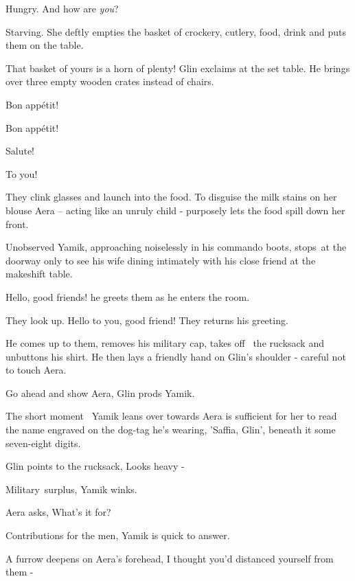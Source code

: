 \documentclass[12pt]{book}
\begin{document}
{\textquotedbl}Hungry. And how are \textit{you}?{\textquotedbl}

{\textquotedbl}Starving.{\textquotedbl} She deftly empties the basket of crockery, cutlery, food, drink and puts them on
the table.

{\textquotedbl}That basket of yours is a horn of plenty!{\textquotedbl} Glin exclaims at the set table. He brings over
three empty wooden crates instead of chairs.

{\textquotedbl}Bon app\'etit!{\textquotedbl}

{\textquotedbl}Bon app\'etit!{\textquotedbl}

{\textquotedbl}Salute!{\textquotedbl}

{\textquotedbl}To you!{\textquotedbl}

They clink glasses and launch into the food. To disguise the milk stains on her blouse Aera -- acting like an unruly
child - purposely lets the food spill down her front.

Unobserved Yamik, approaching noiselessly in his commando boots, stops~at the doorway only to see his wife dining
intimately with his close friend at the makeshift table.

{\textquotedbl}Hello, good friends!{\textquotedbl} he greets them as he enters the room. ~

They look up. {\textquotedbl}Hello to you,{ }good{ }friend!{\textquotedbl} They returns
his greeting.

He comes up to them, removes{ }his military cap, takes off \ the rucksack and
unbuttons his shirt. He then lays a friendly hand on Glin's shoulder - careful not to touch Aera.

{\textquotedbl}Go ahead and show Aera,{\textquotedbl} Glin prods Yamik.

The short moment \ Yamik leans over towards Aera is sufficient for her to read the name engraved on the
dog{{}-}tag he's wearing, 'Saffia, Glin', beneath it some seven-eight digits.

Glin points to the rucksack, {\textquotedbl}Looks heavy -{\textquotedbl}~

{\textquotedbl}Military~surplus,{\textquotedbl} Yamik winks.

Aera asks, {\textquotedbl}What's it for?{\textquotedbl}

{\textquotedbl}Contributions for the men,{\textquotedbl} Yamik is quick to answer.

A furrow deepens on Aera's forehead, {\textquotedbl}I thought you'd distanced yourself from them -{\textquotedbl}
\end{document}
